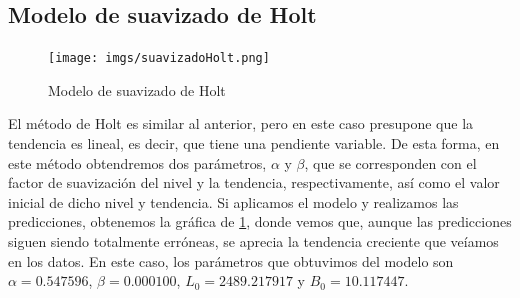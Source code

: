 \documentclass[a4paper,onecolumn]{extarticle}
\begin{document}
\begin{sloppypar}
\subsection{Modelo de suavizado de Holt} \label{suavizadoHolt}
\begin{center}
    \begin{figure}[h!]
        \centering
        \texttt{[image: imgs/suavizadoHolt.png]}
        \caption{Modelo de suavizado de Holt} \label{fig:suavizadoHolt}
    \end{figure}
\end{center}
El método de Holt es similar al anterior, pero en este caso presupone que la tendencia es lineal, es decir, que tiene una pendiente variable. De esta forma, 
en este método obtendremos dos parámetros, $\alpha$ y $\beta$, que se corresponden con el factor de suavización del nivel y la tendencia, respectivamente, así 
como el valor inicial de dicho nivel y tendencia. Si aplicamos el modelo y realizamos las predicciones, obtenemos la gráfica de \ref{fig:suavizadoHolt}, donde 
vemos que, aunque las predicciones siguen siendo totalmente erróneas, se aprecia la tendencia creciente que veíamos en los datos. En este caso, los parámetros 
que obtuvimos del modelo son $\alpha=0.547596$, $\beta=0.000100$, $L_{0}=2489.217917$ y $B_{0}=10.117447$.


\end{sloppypar}
\end{document}
